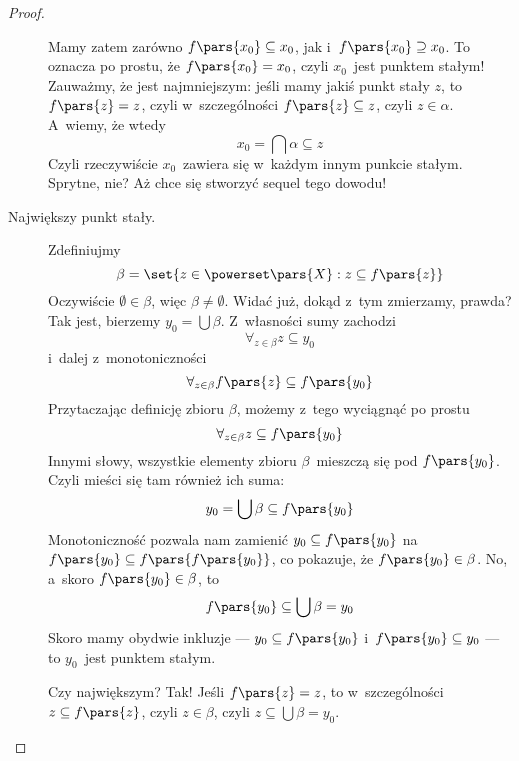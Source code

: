 \begin{proof}
\begin{description}
            Mamy zatem zarówno \(f\pars{x_0} \subseteq x_0\), jak i~\(f\pars{x_0} \supseteq x_0\). To oznacza po prostu, że \(f\pars{x_0} = x_0\), czyli \(x_0\)~jest punktem stałym! Zauważmy, że jest najmniejszym: jeśli mamy jakiś punkt stały \(z\), to \(f\pars{z} = z\), czyli w~szczególności \(f\pars{z} \subseteq z\), czyli \(z \in \alpha\). A~wiemy, że wtedy
            \begin{equation*}
                x_0 = \bigcap \alpha \subseteq z
            \end{equation*}
            Czyli rzeczywiście \(x_0\)~zawiera się w~każdym innym punkcie stałym. Sprytne, nie? Aż chce się stworzyć sequel tego dowodu!
        \item[Największy punkt stały.] Zdefiniujmy
            \begin{equation*}
                \beta = \set{z \in \powerset\pars{X} : z \subseteq f\pars{z}}
            \end{equation*}
            Oczywiście \(\emptyset \in \beta\), więc \(\beta \neq \emptyset\). Widać już, dokąd z~tym zmierzamy, prawda? Tak jest, bierzemy \(y_0 = \bigcup \beta\). Z~własności sumy zachodzi
            \begin{equation*}
                \forall_{z \in \beta} z \subseteq y_0
            \end{equation*}
            i~dalej z~monotoniczności
            \begin{equation*}
                \forall_{z \in \beta} f\pars{z} \subseteq f\pars{y_0}
            \end{equation*}
            Przytaczając definicję zbioru \(\beta\), możemy z~tego wyciągnąć po prostu
            \begin{equation*}
                \forall_{z \in \beta} z \subseteq f\pars{y_0}
            \end{equation*}
            Innymi słowy, wszystkie elementy zbioru \(\beta\)~mieszczą się pod \(f\pars{y_0}\). Czyli mieści się tam również ich suma:
            \begin{equation*}
                y_0 = \bigcup \beta \subseteq f\pars{y_0}
            \end{equation*}
            Monotoniczność pozwala nam zamienić \(y_0 \subseteq f\pars{y_0}\) na \(f\pars{y_0} \subseteq f\pars{f\pars{y_0}}\), co pokazuje, że \(f\pars{y_0} \in \beta\). No, a~skoro \(f\pars{y_0} \in \beta\), to
            \begin{equation*}
                f\pars{y_0} \subseteq \bigcup \beta = y_0
            \end{equation*}
            Skoro mamy obydwie inkluzje --- \(y_0 \subseteq f\pars{y_0}\) i~\(f\pars{y_0} \subseteq y_0\) --- to \(y_0\)~jest punktem stałym.
            
            Czy największym? Tak! Jeśli \(f\pars{z} = z\), to w~szczególności \(z \subseteq f\pars{z}\), czyli \(z \in \beta\), czyli \(z \subseteq \bigcup \beta = y_0\).
    \end{description}
\end{proof}
